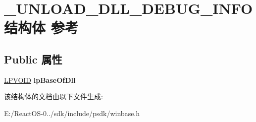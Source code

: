 \hypertarget{struct___u_n_l_o_a_d___d_l_l___d_e_b_u_g___i_n_f_o}{}\section{\+\_\+\+U\+N\+L\+O\+A\+D\+\_\+\+D\+L\+L\+\_\+\+D\+E\+B\+U\+G\+\_\+\+I\+N\+F\+O结构体 参考}
\label{struct___u_n_l_o_a_d___d_l_l___d_e_b_u_g___i_n_f_o}
\subsection*{Public 属性}
\begin{DoxyCompactItemize}
\item 
\mbox{\label{struct___u_n_l_o_a_d___d_l_l___d_e_b_u_g___i_n_f_o_a2761eddb9f2630d17346043ec2da185f}} 
\hyperlink{interfacevoid}{L\+P\+V\+O\+ID} {\bfseries lp\+Base\+Of\+Dll}
\end{DoxyCompactItemize}


该结构体的文档由以下文件生成\+:\begin{DoxyCompactItemize}
\item 
E\+:/\+React\+O\+S-\/0../sdk/include/psdk/winbase.\+h\end{DoxyCompactItemize}
